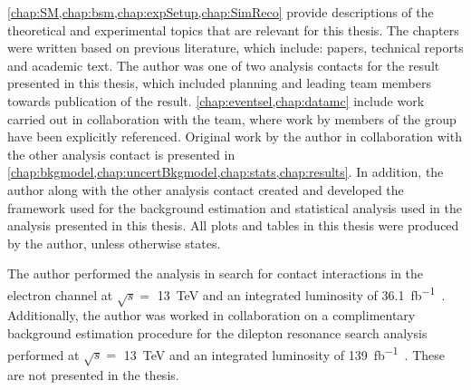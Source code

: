 \cref{chap:SM,chap:bsm,chap:expSetup,chap:SimReco} provide descriptions of the theoretical and experimental topics that are relevant for this thesis. The chapters were written based on previous literature, which include: papers, technical reports and academic text. The author was one of two analysis contacts for the result presented in this thesis, which included planning and leading team members towards publication of the result. \cref{chap:eventsel,chap:datamc} include work carried out in collaboration with the team, where work by members of the group have been explicitly referenced. Original work by the author in collaboration with the other analysis contact is presented in \cref{chap:bkgmodel,chap:uncertBkgmodel,chap:stats,chap:results}. In addition, the author along with the other analysis contact created and developed the framework used for the background estimation and statistical analysis used in the analysis presented in this thesis. All plots and tables in this thesis were produced by the author, unless otherwise states. 

The author performed the analysis in search for contact interactions in the electron channel at $\sqrt{s} = $ \SI{13}{\tera\electronvolt} and an integrated luminosity of \SI{36.1}{\femto\barn^{-1}}~\cite{EXOT-2016-05}. Additionally, the author was worked in collaboration on a complimentary background estimation procedure for the dilepton resonance search analysis performed  at $\sqrt{s} = $ \SI{13}{\tera\electronvolt} and an integrated luminosity of \SI{139}{\femto\barn^{-1}}~\cite{Aad:2019fac}. These are not presented in the thesis. 
